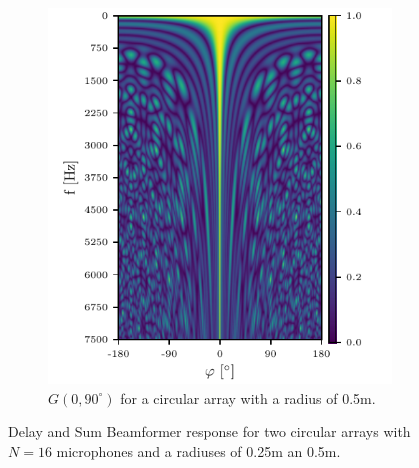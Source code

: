 \begin{figure}[h]
\begin{subfigure}[t]{0.45\textwidth}
		\includegraphics[width=\textwidth]{circ_f_sweep_1.pdf}
		\caption{$G(0, 90^\circ)$ for a circular array with a radius of 0.5m.} 
		\label{ssl:fig:f_dep1}
	\end{subfigure}
	\caption{Delay and Sum Beamformer response for two circular arrays with $N=16$ microphones 
	and a radiuses of 0.25m an 0.5m. }
	\label{ssl:fig:f_deps}
\end{figure}


